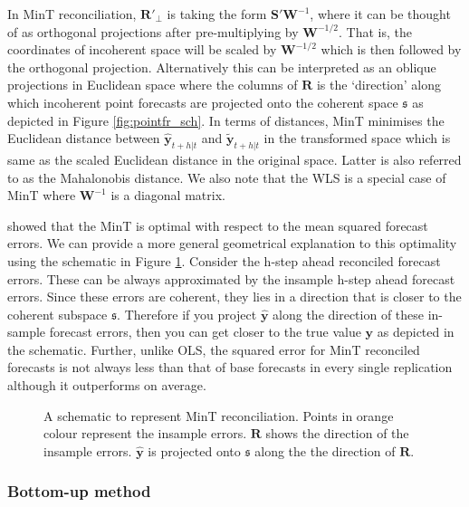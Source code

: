 \documentclass[12pt]{article}
\theoremstyle{definition}
\theoremstyle{property}
\begin{document}
	
	In MinT reconciliation, $\bm{R}'_\perp$ is taking the form $\bm{S}'{\bm{W}}^{-1}$, where it can be thought of as orthogonal projections after pre-multiplying by ${\bm{W}^{-1/2}}$. That is, the coordinates of incoherent space will be scaled by $\bm{W}^{-1/2}$ which is then followed by the orthogonal projection. Alternatively this can be interpreted as an oblique projections in Euclidean space where the columns of $\bm{R}$ is the `direction' along which incoherent point forecasts are projected onto the coherent space $\mathfrak{s}$ as depicted in Figure \ref{fig:pointfr_sch}. In terms of distances, MinT minimises the Euclidean distance between $\hat{\bm{y}}_{t+h|t}$ and $\tilde{\bm{y}}_{t+h|t}$ in the transformed space which is same as the scaled Euclidean distance in the original space. Latter is also referred to as the Mahalonobis distance. We also note that the WLS is a special case of MinT where $\bm{W}^{-1}$ is a diagonal matrix. 
	
	\citet{Wickramasuriya2017} showed that the MinT is optimal with respect to the mean squared forecast errors. 
	We can provide a more general geometrical explanation to this optimality using the schematic in Figure \ref{fig:MinT_justification}. Consider the h-step ahead reconciled forecast errors. These can be always approximated by the insample h-step ahead forecast errors. Since these errors are coherent, they lies in a direction that is closer to the coherent subspace $\mathfrak{s}$. Therefore if you project $\hat{\bm{y}}$ along the direction of these in-sample forecast errors, then you can get closer to the true value $\bm{y}$ as depicted in the schematic. Further, unlike OLS, the squared error for MinT reconciled forecasts is not always less than that of base forecasts in every single replication although it outperforms on average.


	 	
	 \begin{figure}[H]
	 		\centering
	 		\small
	 		\resizebox{\linewidth}{!}{
	 			
	 		}
	 		\caption{A schematic to represent MinT reconciliation. Points in orange colour represent the insample errors. $\bm{R}$ shows the direction of the insample errors. $\hat{\bm{y}}$ is projected onto $\mathfrak{s}$ along the the direction of $\bm{R}$.}\label{fig:MinT_justification}
	 \end{figure}
	
	\subsubsection{Bottom-up method}
	
\end{document}
